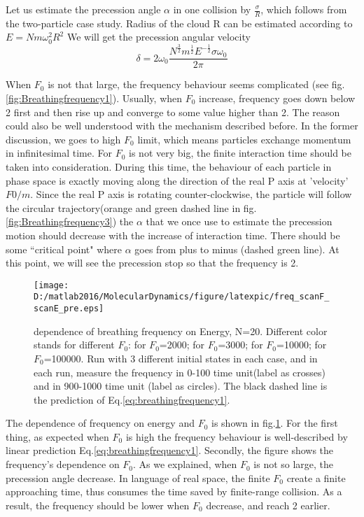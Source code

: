\documentclass[aps,pre,twocolumn,groupedaddress]{revtex4-1}
\begin{document}
Let us estimate the precession angle $\alpha$ in one collision by $\frac{\sigma}{R}$, which follows from the two-particle case study. Radius of the cloud R can be estimated according to $E=Nm\omega_0^2R^2$
We will get the precession angular velocity 
\begin{equation}
\delta=2\omega_0\frac{N^\frac{3}{2}m^{\frac{1}{2}}E^{-\frac{1}{2}}\sigma\omega_0}{2\pi}
\label{eq:breathingfrequency1}
\end{equation}





When $F_0$ is not that large, the frequency behaviour seems complicated (see fig.\ref{fig:Breathingfrequency1}). Usually, when $F_0$ increase, frequency goes down below 2 first and then rise up and converge to some value higher than 2. The reason could also be well understood with the mechanism described before. In the former discussion, we goes to high $F_0$ limit, which means particles exchange momentum in infinitesimal time. For $F_0$ is not very big, the finite interaction time should be taken into consideration. During this time, the behaviour of each particle in phase space is exactly moving along the direction of the real P axis at 'velocity' $F0/m$. Since the real P axis is rotating counter-clockwise, the particle will follow the circular trajectory(orange and green dashed line in fig.\ref{fig:Breathingfrequency3}) the $\alpha$ that we once use to estimate the precession motion should decrease with the increase of interaction time. There should be some ``critical point" where $\alpha$ goes from plus to minus (dashed green line). At this point, we will see the precession stop so that the frequency is 2. 


\begin{figure}
\centering
\texttt{[image: D:/matlab2016/MolecularDynamics/figure/latexpic/freq\_scanF\_scanE\_pre.eps]}
\caption{dependence of breathing frequency on Energy, N=20. Different color stands for different $F_0$: {\color{red}{Red}} for $F_0$=2000; {\color{yellow}{Yellow}} for $F_0$=3000; {\color{green}{Green}} for $F_0$=10000;  {\color{blue}{Blue}} for $F_0$=100000. Run with 3 different initial states in each case, and in each run, measure the frequency in 0-100 time unit(label as crosses) and in 900-1000 time unit (label as circles). The black dashed line is the prediction of Eq.\ref{eq:breathingfrequency1}.}
\label{fig:Breathingfrequency4}
\end{figure}

The dependence of frequency on energy and $F_0$ is shown in fig.\ref{fig:Breathingfrequency4}. For the first thing, as expected when $F_0$ is high the frequency behaviour is well-described by linear prediction Eq.\ref{eq:breathingfrequency1}. Secondly, the figure shows the frequency's dependence on $F_0$. As we explained, when $F_0$ is not so large, the precession angle decrease. In language of real space, the finite $F_0$ create a finite approaching time, thus consumes the time saved by finite-range collision. As a result, the frequency should be lower when $F_0$ decrease, and reach 2 earlier.
\end{document}

